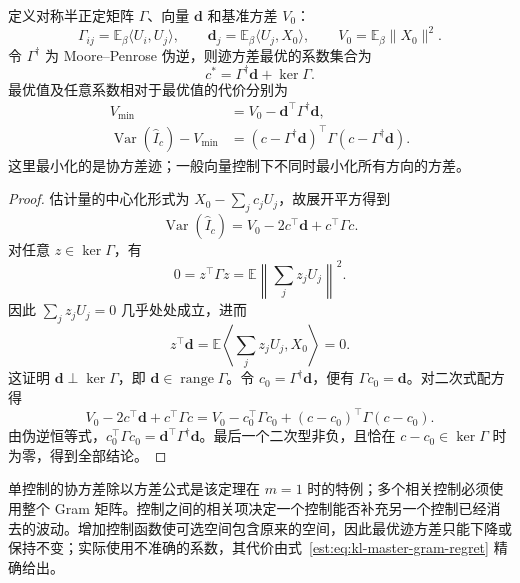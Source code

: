\documentclass[lang=cn,scheme=chinese,openany]{../book/elegantbook}
\newcommand{\E}{\mathbb E}
\newcommand{\Var}{\operatorname{Var}}
\begin{document}
\begin{theorem}
\label{est:thm:kl-master-gram}
定义对称半正定矩阵 $\Gamma$、向量 $\mathbf d$ 和基准方差 $V_0$：
\begin{equation*}
 \Gamma_{ij}=\E_\beta\langle U_i,U_j\rangle,\qquad
 \mathbf d_j=\E_\beta\langle U_j,X_0\rangle,\qquad
 V_0=\E_\beta\lVert X_0\rVert^2.
\end{equation*}
令 $\Gamma^\dagger$ 为 Moore--Penrose 伪逆，则迹方差最优的系数集合为
\begin{equation*}
 c^*=\Gamma^\dagger\mathbf d+\ker\Gamma.
\end{equation*}
最优值及任意系数相对于最优值的代价分别为
\begin{align}
 V_{\min}&=V_0-\mathbf d^\top\Gamma^\dagger\mathbf d,\\
 \Var(\widehat I_c)-V_{\min}
 &=(c-\Gamma^\dagger\mathbf d)^\top\Gamma(c-\Gamma^\dagger\mathbf d).
 \label{est:eq:kl-master-gram-regret}
\end{align}
这里最小化的是协方差迹；一般向量控制下不同时最小化所有方向的方差。
\end{theorem}

\begin{proof}
估计量的中心化形式为 $X_0-\sum_jc_jU_j$，故展开平方得到
\begin{equation*}
 \Var(\widehat I_c)=V_0-2c^\top\mathbf d+c^\top\Gamma c.
\end{equation*}
对任意 $z\in\ker\Gamma$，有
\begin{equation*}
 0=z^\top\Gamma z=\E\left\lVert\sum_jz_jU_j\right\rVert^2.
\end{equation*}
因此 $\sum_jz_jU_j=0$ 几乎处处成立，进而
\begin{equation*}
 z^\top\mathbf d=\E\left\langle\sum_jz_jU_j,X_0\right\rangle=0.
\end{equation*}
这证明 $\mathbf d\perp\ker\Gamma$，即 $\mathbf d\in\operatorname{range}\Gamma$。令 $c_0=\Gamma^\dagger\mathbf d$，便有 $\Gamma c_0=\mathbf d$。对二次式配方得
\begin{equation*}
 V_0-2c^\top\mathbf d+c^\top\Gamma c
 =V_0-c_0^\top\Gamma c_0+(c-c_0)^\top\Gamma(c-c_0).
\end{equation*}
由伪逆恒等式，$c_0^\top\Gamma c_0=\mathbf d^\top\Gamma^\dagger\mathbf d$。最后一个二次型非负，且恰在 $c-c_0\in\ker\Gamma$ 时为零，得到全部结论。
\end{proof}

单控制的协方差除以方差公式是该定理在 $m=1$ 时的特例；多个相关控制必须使用整个 Gram 矩阵。控制之间的相关项决定一个控制能否补充另一个控制已经消去的波动。增加控制函数使可选空间包含原来的空间，因此最优迹方差只能下降或保持不变；实际使用不准确的系数，其代价由式~\eqref{est:eq:kl-master-gram-regret} 精确给出。
\end{document}
